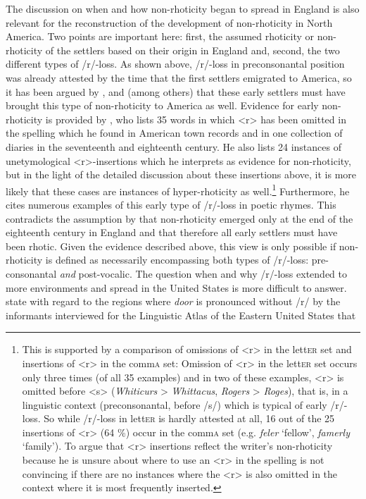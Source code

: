 The discussion on when and how non-rhoticity began to spread in England is also relevant for the reconstruction of the development of non-rhoticity in North America. Two points are important here: first, the assumed rhoticity or non-rhoticity of the settlers based on their origin in England and, second, the two different types of /r/-loss. As shown above, /r/-loss in preconsonantal position was already attested by the time that the first settlers emigrated to America, so it has been argued by \citet{Kurath1971}, \citet{Fisher2001} and \citet{Montgomery2001} (among others) that these early settlers must have brought this type of non-rhoticity to America as well. Evidence for early non-rhoticity is provided by \citet[228--230]{Krapp19252}, who lists 35 words in which <r> has been omitted in the spelling which he found in American town records and in one collection of diaries in the seventeenth and eighteenth century. He also lists 24 instances of unetymological <r>-insertions which he interprets as evidence for non-rhoticity, but in the light of the detailed discussion about these insertions above, it is more likely that these cases are instances of hyper-rhoticity as well.\footnote{This is supported by a comparison of omissions of <r> in the lett\textsc{er} set and insertions of <r> in the comm\textsc{a} set: Omission of <r> in the lett\textsc{er} set occurs only three times (of all 35 examples) and in two of these examples, <r> is omitted before <s> (\emph{Whiticurs} > \emph{Whittacus}, \emph{Rogers} > \emph{Roges}), that is, in a linguistic context (preconsonantal, before /s/) which is typical of early /r/-loss. So while /r/-loss in lett\textsc{er} is hardly attested at all, 16 out of the 25 insertions of <r> (64 \%) occur in the comm\textsc{a} set (e.g. \emph{feler} ‘fellow’, \emph{famerly} ‘family’). To argue that <r> insertions reflect the writer’s non-rhoticity because he is unsure about where to use an <r> in the spelling is not convincing if there are no instances where the <r> is also omitted in the context where it is most frequently inserted.} Furthermore, he cites numerous examples of this early type of /r/-loss in poetic rhymes. This contradicts the assumption by \citet[136]{Newman2014} that non-rhoticity emerged only at the end of the eighteenth century in England and that therefore all early settlers must have been rhotic. Given the evidence described above, this view is only possible if non-rhoticity is defined as necessarily encompassing both types of /r/-loss: pre-consonantal \emph{and} post-vocalic. The question when and why /r/-loss extended to more environments and spread in the United States is more difficult to answer. \citet[171]{Kurath1961} state with regard to the regions where \emph{door} is pronounced without /r/ by the informants interviewed for the Linguistic Atlas of the Eastern United States that

